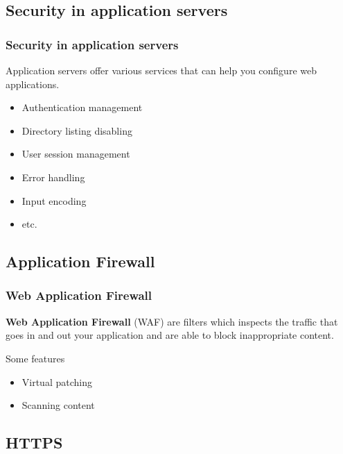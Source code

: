 \subsection{Security in application servers}

\begin{frame}
\frametitle{Security in application servers}
Application servers offer various services that can help you configure
web applications.

\begin{itemize}
\item Authentication management
\item Directory listing disabling
\item User session management
\item Error handling
\item Input encoding
\item etc.
\end{itemize}
\end{frame}

\subsection{Application Firewall}

\begin{frame}
\frametitle{Web Application Firewall}
\textbf{Web Application Firewall} (WAF) are filters which inspects the traffic
that goes in and out your application and are able to block inappropriate
content.

\begin{block}{Some features}
\begin{itemize}
\item Virtual patching
\item Scanning content
\end{itemize}
\end{block}
\end{frame}

\subsection{HTTPS}

